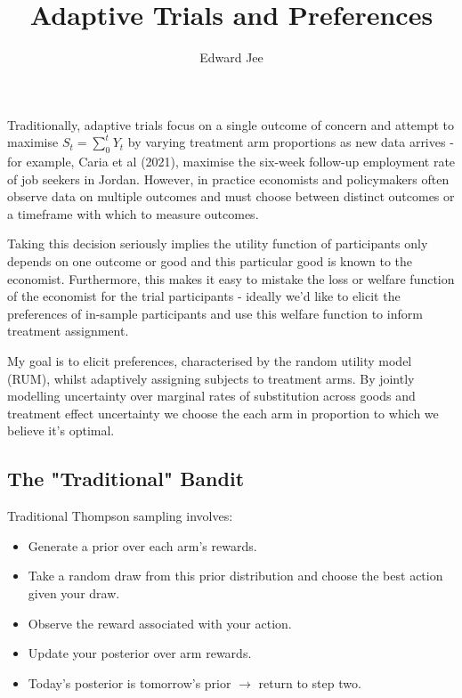 \documentclass{article}
\title{Adaptive Trials and Preferences}
\author{Edward Jee}
\begin{document}




Traditionally, adaptive trials focus on a single outcome of concern and attempt to maximise 
$S_t = \sum^t_{0}Y_t$ by varying treatment arm proportions as new data arrives - for example, Caria et al (2021), maximise the 
six-week follow-up employment rate of job seekers in Jordan. However, in 
practice economists and policymakers often observe data on multiple outcomes and must 
choose between distinct outcomes or a timeframe with which to measure outcomes.
    
Taking this decision seriously 
implies the utility function of participants only depends on one outcome or good 
and this particular good is known to the economist. Furthermore, this makes it 
easy to mistake the loss or welfare function of the economist for the trial 
participants - ideally we'd like to elicit the preferences of in-sample participants 
and use this welfare function to inform treatment assignment. 


My goal is  to elicit preferences, characterised by the 
random utility model (RUM), whilst adaptively assigning subjects 
to treatment arms. By jointly modelling uncertainty over marginal rates of substitution 
across goods and treatment effect uncertainty we choose the each arm in proportion 
to which we believe it's optimal.

\subsection*{The "Traditional" Bandit}


Traditional Thompson sampling involves:


    \begin{itemize}
        \item Generate a prior over each arm's rewards.
        \item Take a random draw from this prior distribution and choose the best action given your draw.
        \item Observe the reward associated with your action.
        \item Update your posterior over arm rewards.
        \item Today's posterior is tomorrow's prior $\rightarrow$ return to step two.
    \end{itemize}
\end{document}
